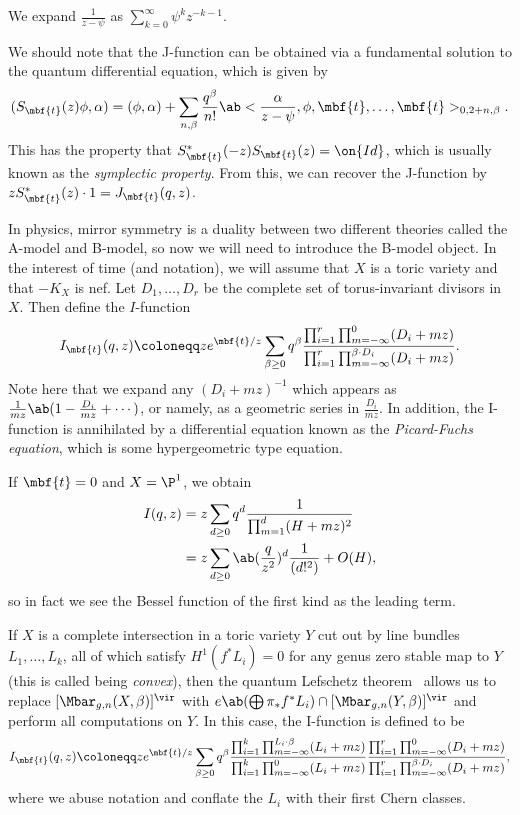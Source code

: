 \begin{rmk}
    We expand \(\frac{1}{z-\psi}\) as \(\sum_{k=0}^{\infty} \psi^k z^{-k-1}\).  
\end{rmk}

We should note that the J-function can be obtained via a fundamental solution to the quantum differential equation, which is given by
\[ ( S_{\mbf{t}}(z) \phi , \alpha) = (\phi, \alpha) + \sum_{n, \beta} \frac{q^{\beta}}{n!} \ab<\frac{\alpha}{z-\psi}, \phi, \mbf{t}, \ldots, \mbf{t}>_{0, 2+n, \beta}. \]
This has the property that \(S_{\mbf{t}}^*(-z) S_{\mbf{t}}(z) = \on{Id}\), which is usually known as the \textit{symplectic property}. From this, we can recover the J-function by \(z S_{\mbf{t}}^*(z)\cdot 1 = J_{\mbf{t}}(q, z)\).

In physics, mirror symmetry is a duality between two different theories called the A-model and B-model, so now we will need to introduce the B-model object. In the interest of time (and notation), we will assume that \(X\) is a toric variety and that \(-K_X\) is nef. Let \(D_1, \ldots, D_r\) be the complete set of torus-invariant divisors in \(X\). Then define the \(I\)-function
\[
    I_{\mbf{t}}(q, z) \coloneqq z e^{\mbf{t}/z} \sum_{\beta \geq 0} q^{\beta} \frac{\prod_{i=1}^r \prod_{m = -\infty}^{0} (D_i + mz)}{\prod_{i=1}^r \prod_{m=-\infty}^{\beta \cdot D_i} (D_i + mz)}.
\]
Note here that we expand any \((D_i + mz)^{-1}\) which appears as \(\frac{1}{mz} \ab(1 - \frac{D_i}{mz} + \cdots)\), or namely, as a geometric series in \(\frac{D_i}{mz}\). In addition, the I-function is annihilated by a differential equation known as the \textit{Picard-Fuchs equation}, which is some hypergeometric type equation.

\begin{exm}
    If \(\mbf{t} = 0\) and \(X = \P^1\), we obtain
    \begin{align*}
        I(q,z) &= z\sum_{d \geq 0} q^d \frac{1}{\prod_{m=1}^d (H + mz)^2} \\
        &= z\sum_{d \geq 0} \ab(\frac{q}{z^2})^d \frac{1}{(d!^2)} + O(H),
    \end{align*}
    so in fact we see the Bessel function of the first kind as the leading term.
\end{exm}

If \(X\) is a complete intersection in a toric variety \(Y\) cut out by line bundles \(L_1, \ldots, L_k\), all of which satisfy \(H^1(f^* L_i) = 0\) for any genus zero stable map to \(Y\) (this is called being \textit{convex}), then the quantum Lefschetz theorem~\cite{CoatesGivental2007} allows us to replace \([\Mbar_{g,n}(X, \beta)]^{\vir}\) with \(e\ab(\bigoplus \pi_* f^* L_i) \cap [\Mbar_{g,n}(Y, \beta)]^{\vir}\) and perform all computations on \(Y\). In this case, the I-function is defined to be
\[
    I_{\mbf{t}}(q,z) \coloneqq z e^{\mbf{t}/z} \sum_{\beta \geq 0} q^{\beta} \frac{\prod_{i=1}^k \prod_{m=-\infty}^{L_i \cdot \beta} (L_i + mz)}{\prod_{i=1}^k \prod_{m=-\infty}^{0} (L_i + mz)} \frac{\prod_{i=1}^r \prod_{m = -\infty}^{0} (D_i + mz)}{\prod_{i=1}^r \prod_{m=-\infty}^{\beta \cdot D_i} (D_i + mz)},
\]
where we abuse notation and conflate the \(L_i\) with their first Chern classes.

